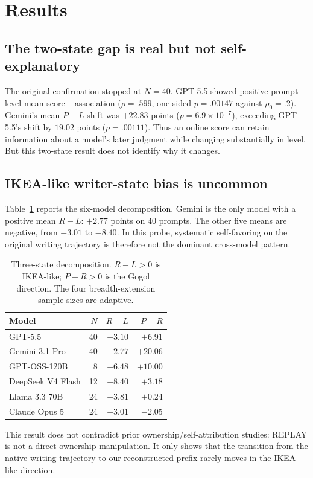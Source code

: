 \section{Results}
\subsection{The two-state gap is real but not self-explanatory}
The original confirmation stopped at $N=40$. GPT-5.5 showed positive prompt-level mean-score \live{}--\post{} association ($\rho=.599$, one-sided $p=.00147$ against $\rho_0=.2$). Gemini's mean $P-L$ shift was $+22.83$ points ($p=6.9\times10^{-7}$), exceeding GPT-5.5's shift by $19.02$ points ($p=.00111$). Thus an online score can retain information about a model's later judgment while changing substantially in level. But this two-state result does not identify why it changes.

\subsection{IKEA-like writer-state bias is uncommon}
Table~\ref{tab:decomp} reports the six-model decomposition. Gemini is the only model with a positive mean $R-L$: $+2.77$ points on 40 prompts. The other five means are negative, from $-3.01$ to $-8.40$. In this probe, systematic self-favoring on the original writing trajectory is therefore not the dominant cross-model pattern.

\begin{table}[t]
\centering
\caption{Three-state decomposition. $R-L>0$ is IKEA-like; $P-R>0$ is the Gogol direction. The four breadth-extension sample sizes are adaptive.}
\label{tab:decomp}
\small
\begin{tabular}{lrrr}
\toprule
Model & $N$ & $R-L$ & $P-R$\\
\midrule
GPT-5.5 & 40 & $-3.10$ & $+6.91$\\
Gemini 3.1 Pro & 40 & $+2.77$ & $+20.06$\\
GPT-OSS-120B & 8 & $-6.48$ & $+10.00$\\
DeepSeek V4 Flash & 12 & $-8.40$ & $+3.18$\\
Llama 3.3 70B & 24 & $-3.81$ & $+0.24$\\
Claude Opus 5 & 24 & $-3.01$ & $-2.05$\\
\bottomrule
\end{tabular}
\end{table}

This result does not contradict prior ownership/self-attribution studies: REPLAY is not a direct ownership manipulation. It only shows that the transition from the native writing trajectory to our reconstructed prefix rarely moves in the IKEA-like direction.

